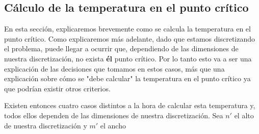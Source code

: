 \subsection{Cálculo de la temperatura en el punto crítico}
En esta sección, explicaremos brevemente como se calcula la temperatura en el punto crítico. Como explicaremos más adelante, dado que estamos discretizando el problema, puede llegar a ocurrir que, dependiendo de las dimensiones de nuestra discretización, no exista \textbf{él} punto crítico. Por lo tanto esto va a ser una explicación de las decisiones que tomamos en estos casos, más que una explicación sobre cómo se "debe calcular" la temperatura en el punto crítico ya que podrían existir otros criterios.
\par Existen entonces cuatro casos distintos a la hora de calcular esta temperatura y, todos ellos dependen de las dimensiones de nuestra discretización. Sea $n'$ el alto de nuestra discretización y $m'$ el ancho
